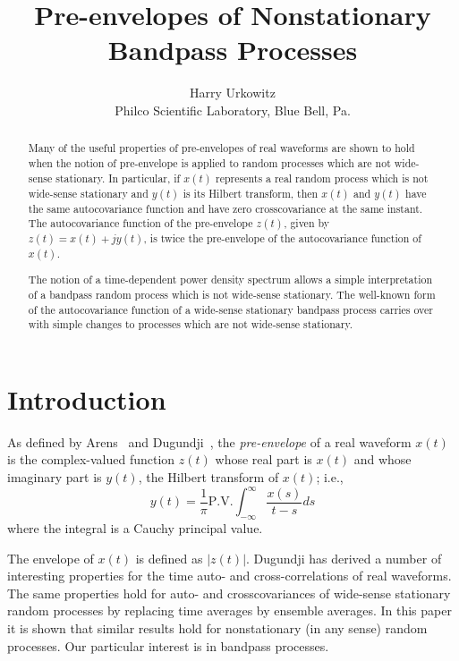 \documentclass{article}
\newcommand{\tmaffiliation}[1]{\\ #1}
\newcommand{\tmem}[1]{{\em #1\/}}
\begin{document}
\title{Pre-envelopes of Nonstationary Bandpass Processes}

\author{
  Harry Urkowitz
  \tmaffiliation{Philco Scientific Laboratory, Blue Bell, Pa.}
}

\date{}

\maketitle

\begin{abstract}
  Many of the useful properties of pre-envelopes of real waveforms are shown
  to hold when the notion of pre-envelope is applied to random processes which
  are not wide-sense stationary. In particular, if $x (t)$ represents a real
  random process which is not wide-sense stationary and $y (t)$ is its Hilbert
  transform, then $x (t)$ and $y (t)$ have the same autocovariance function
  and have zero crosscovariance at the same instant. The autocovariance
  function of the pre-envelope $z (t)$, given by $z (t) = x (t) + jy (t)$, is
  twice the pre-envelope of the autocovariance function of $x (t)$.
  
  The notion of a time-dependent power density spectrum allows a simple
  interpretation of a bandpass random process which is not wide-sense
  stationary. The well-known form of the autocovariance function of a
  wide-sense stationary bandpass process carries over with simple changes to
  processes which are not wide-sense stationary.
\end{abstract}

{\tableofcontents}

\section{Introduction}

As defined by Arens~{\cite{arens1957}} and Dugundji~{\cite{dugundji1958}}, the
{\tmem{pre-envelope}} of a real waveform $x (t)$ is the complex-valued
function $z (t)$ whose real part is $x (t)$ and whose imaginary part is $y
(t)$, the Hilbert transform of $x (t)$; i.e.,
\begin{equation}
  y (t) = \frac{1}{\pi}  \textrm{P.V.}  \int_{- \infty}^{\infty} \frac{x
  (s)}{t - s} ds \label{eq:hilbert_transform}
\end{equation}
where the integral is a Cauchy principal value.

The envelope of $x (t)$ is defined as $|z (t) |$. Dugundji has derived a
number of interesting properties for the time auto- and cross-correlations of
real waveforms. The same properties hold for auto- and crosscovariances of
wide-sense stationary random processes by replacing time averages by ensemble
averages. In this paper it is shown that similar results hold for
nonstationary (in any sense) random processes. Our particular interest is in
bandpass processes.
\end{document}
